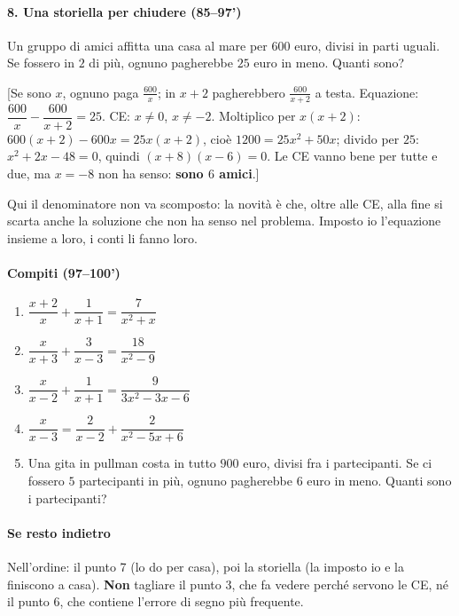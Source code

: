 \documentclass[11pt]{report}
\begin{document}
\paragraph{8. Una storiella per chiudere (85--97')}
Un gruppo di amici affitta una casa al mare per $600$ euro, divisi in parti uguali. Se fossero in $2$ di più, ognuno pagherebbe $25$ euro in meno. Quanti sono?

[Se sono $x$, ognuno paga $\frac{600}{x}$; in $x+2$ pagherebbero $\frac{600}{x+2}$ a testa. Equazione: $\dfrac{600}{x}-\dfrac{600}{x+2}=25$. CE: $x\neq0$, $x\neq-2$. Moltiplico per $x(x+2)$: $600(x+2)-600x=25x(x+2)$, cioè $1200=25x^2+50x$; divido per $25$: $x^2+2x-48=0$, quindi $(x+8)(x-6)=0$. Le CE vanno bene per tutte e due, ma $x=-8$ non ha senso: \textbf{sono $6$ amici}.]

Qui il denominatore non va scomposto: la novità è che, oltre alle CE, alla fine si scarta anche la soluzione che non ha senso nel problema. Imposto io l'equazione insieme a loro, i conti li fanno loro.

\paragraph{Compiti (97--100')}
\begin{enumerate}
    \item $\dfrac{x+2}{x}+\dfrac{1}{x+1}=\dfrac{7}{x^2+x}$ \quad [CE: $x\neq0$, $x\neq-1$; $x^2+4x-5=0$: $x=-5$, $x=1$, tutte e due accettabili]
    \item $\dfrac{x}{x+3}+\dfrac{3}{x-3}=\dfrac{18}{x^2-9}$ \quad [CE: $x\neq\pm3$; resta $x^2-9=0$, cioè $x=\pm3$: tutte e due da scartare, \textbf{impossibile}]
    \item $\dfrac{x}{x-2}+\dfrac{1}{x+1}=\dfrac{9}{3x^2-3x-6}$ \quad [$3x^2-3x-6=3(x-2)(x+1)$: raccoglimento, poi trinomio. CE: $x\neq2$, $x\neq-1$. Moltiplico per $3(x-2)(x+1)$: $3x(x+1)+3(x-2)=9$, cioè $x^2+2x-5=0$: $x=-1\pm\sqrt6$, tutte e due accettabili]
    \item $\dfrac{x}{x-3}=\dfrac{2}{x-2}+\dfrac{2}{x^2-5x+6}$ \quad [$x^2-4x+4=0$: $x=2$, da scartare: \textbf{impossibile}]
    \item Una gita in pullman costa in tutto $900$ euro, divisi fra i partecipanti. Se ci fossero $5$ partecipanti in più, ognuno pagherebbe $6$ euro in meno. Quanti sono i partecipanti? \quad [$\frac{900}{x}-\frac{900}{x+5}=6$, cioè $x^2+5x-750=0$, $\Delta=3025=55^2$: $x=25$]
\end{enumerate}

\paragraph{Se resto indietro}
Nell'ordine: il punto 7 (lo do per casa), poi la storiella (la imposto io e la finiscono a casa). \textbf{Non} tagliare il punto 3, che fa vedere perché servono le CE, né il punto 6, che contiene l'errore di segno più frequente.
\end{document}
